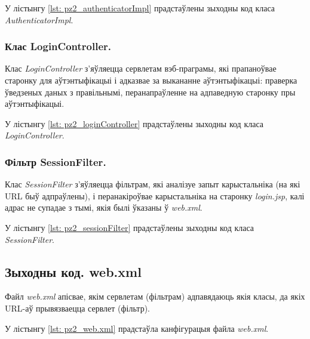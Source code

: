 У лістынгу \ref{lst: pz2_authenticatorImpl} прадстаўлены зыходны код класа \textit{AuthenticatorImpl}.



\subsubsection{Клас LoginController.}

Клас \textit{LoginController} з'яўляецца сервлетам
вэб-праграмы, які прапаноўвае старонку для аўтэнтыфікацыі
і адказвае за выкананне аўтэнтыфікацыі:
праверка ўведзеных даных з правільнымі,
перанапраўленне на адпаведную старонку пры аўтэнтыфікацыі.

У лістынгу \ref{lst: pz2_loginController} прадстаўлены зыходны код класа \textit{LoginController}.



\subsubsection{Фільтр SessionFilter.}

Клас \textit{SessionFilter} з'яўляецца фільтрам, які аналізуе
запыт карыстальніка (на які URL быў адпраўлены), і перанакіроўвае
карыстальніка на старонку \textit{login.jsp}, калі адрас не супадае
з тымі, якія былі ўказаны ў \textit{web.xml}.

У лістынгу \ref{lst: pz2_sessionFilter} прадстаўлены зыходны код класа \textit{SessionFilter}.



\subsection{Зыходны код. web.xml}

Файл \textit{web.xml} апісвае, якім сервлетам (фільтрам) адпавядаюць якія класы,
да якіх URL-аў прывязваецца сервлет (фільтр).

У лістынгу \ref{lst: pz2_web.xml} прадстаўла канфігурацыя файла \textit{web.xml}.

